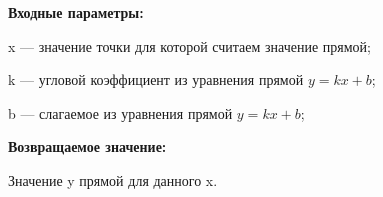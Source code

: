 \textbf{Входные параметры:}  
 
x --- значение точки для которой считаем значение прямой;
 
k --- угловой коэффициент из уравнения прямой $y=kx+b$;
 
b --- слагаемое из уравнения прямой $y=kx+b$; 

\textbf{Возвращаемое значение:}

Значение y прямой для данного x.